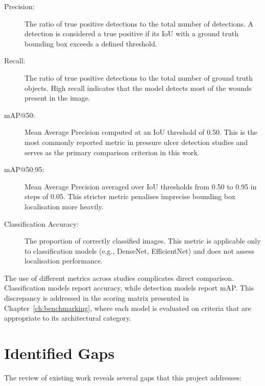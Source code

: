 \documentclass[a4paper,12pt,twoside]{report}
\begin{document}
\begin{description}
  \item[Precision:] The ratio of true positive detections to the total number
    of detections. A detection is considered a true positive if its IoU with a
    ground truth bounding box exceeds a defined threshold.

  \item[Recall:] The ratio of true positive detections to the total number of
    ground truth objects. High recall indicates that the model detects most of
    the wounds present in the image.

  \item[mAP@50:] Mean Average Precision computed at an IoU threshold of 0.50.
    This is the most commonly reported metric in pressure ulcer detection studies
    and serves as the primary comparison criterion in this work.

  \item[mAP@50:95:] Mean Average Precision averaged over IoU thresholds from
    0.50 to 0.95 in steps of 0.05. This stricter metric penalises imprecise
    bounding box localisation more heavily.

  \item[Classification Accuracy:] The proportion of correctly classified images.
    This metric is applicable only to classification models (e.g., DenseNet,
    EfficientNet) and does not assess localisation performance.
\end{description}

The use of different metrics across studies complicates direct comparison.
Classification models report accuracy, while detection models report mAP. This
discrepancy is addressed in the scoring matrix presented in
Chapter~\ref{ch:benchmarking}, where each model is evaluated on criteria that
are appropriate to its architectural category.

\section{Identified Gaps}
\label{sec:gaps}

The review of existing work reveals several gaps that this project addresses:
\end{document}
